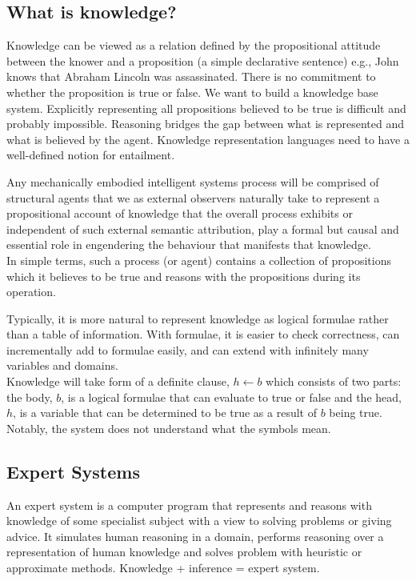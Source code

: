 \documentclass[a4paper]{article}
\theoremstyle{plain}
\theoremstyle{definition}
\newtheorem{defn}{Definition}[section]
\theoremstyle{remark}
\begin{document}
\subsection{What is knowledge?}
Knowledge can be viewed as a relation defined by the propositional attitude between the knower and a proposition (a simple declarative sentence) e.g., John knows that Abraham Lincoln was assassinated. There is no commitment to whether the proposition is true or false. We want to build a knowledge base system. Explicitly representing all propositions believed to be true is difficult and probably impossible. Reasoning bridges the gap between what is represented and what is believed by the agent. Knowledge representation languages need to have a well-defined notion for entailment. 
\begin{tcolorbox}[colback=black!3!white,colframe=black!60!white,title=\begin{defn}Knowledge Representation Hypothesis \label{Knowledge Representation Hypothesis}\end{defn}]
Any mechanically embodied intelligent systems process will be comprised of structural agents that we as external observers naturally take to represent a propositional account of knowledge that the overall process exhibits or independent of such external semantic attribution, play a formal but causal and essential role in engendering the behaviour that manifests that knowledge. \\
In simple terms, such a process (or agent) contains a collection of propositions which it believes to be true and reasons with the propositions during its operation.
\end{tcolorbox}
Typically, it is more natural to represent knowledge as logical formulae rather than a table of information. With formulae, it is easier to check correctness, can incrementally add to formulae easily, and can extend with infinitely many variables and domains. \\
Knowledge will take form of a definite clause, $h \leftarrow b$ which consists of two parts: the body, $b$, is a logical formulae that can evaluate to true or false and the head, $h$, is a variable that can be determined to be true as a result of $b$ being true. Notably, the system does not understand what the symbols mean.
\subsection{Expert Systems}
An expert system is a computer program that represents and reasons with knowledge of some specialist subject with a view to solving problems or giving advice. It simulates human reasoning in a domain, performs reasoning over a representation of human knowledge and solves problem with heuristic or approximate methods. Knowledge + inference = expert system. 
\end{document}
